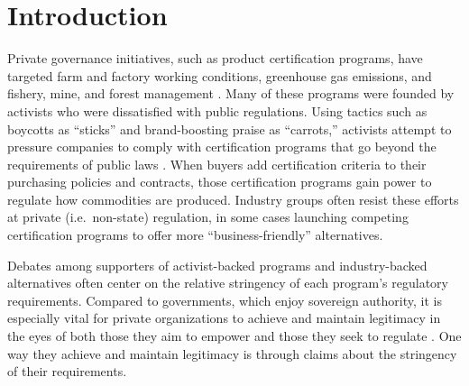 \documentclass[
      12pt,
            Review ]{article}
\author{}
\date{\today}
\begin{document}
 














\noindent 
      \doublespacing 
    \section{Introduction}\label{introduction}

Private governance initiatives, such as product certification programs,
have targeted farm and factory working conditions, greenhouse gas
emissions, and fishery, mine, and forest management
\citep{Auld2014, Bartley2003, Bozzi2012, Hudson2003, VanderVen2015, Vince2017}.
Many of these programs were founded by activists who were dissatisfied
with public regulations. Using tactics such as boycotts as ``sticks''
and brand-boosting praise as ``carrots,'' activists attempt to pressure
companies to comply with certification programs that go beyond the
requirements of public laws \citep{Cashore2002}. When buyers add
certification criteria to their purchasing policies and contracts, those
certification programs gain power to regulate how commodities are
produced. Industry groups often resist these efforts at private
(i.e.~non-state) regulation, in some cases launching competing
certification programs to offer more ``business-friendly'' alternatives.

Debates among supporters of activist-backed programs and industry-backed
alternatives often center on the relative stringency of each program's
regulatory requirements. Compared to governments, which enjoy sovereign
authority, it is especially vital for private organizations to achieve
and maintain legitimacy in the eyes of both those they aim to empower
and those they seek to regulate
\citep{Bartley2007, Bodansky1999, Cashore2002}. One way they achieve and
maintain legitimacy is through claims about the stringency of their
requirements.
\end{document}
